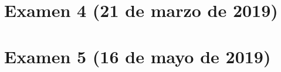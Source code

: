\documentclass[a4paper,12pt,twoside]{book}
\begin{document}
\section{Examen 4 (21 de marzo de 2019)}
\section{Examen 5 (16 de mayo de 2019)}

\appendix %






\nocite{Alonso-12b}
\nocite{Bird-99a}
\nocite{Cunningham-10a}
\nocite{Daume-06}
\nocite{Davie-92a}
\nocite{Doets-04a}
\nocite{Fokker-96}
\nocite{Hudak-00a}
\nocite{Hudak-12a}
\nocite{Hutton-07a}
\nocite{OSullivan-08a}
\nocite{Rabhi-99a}
\nocite{Polya-65a}
\nocite{Ruiz-04}
\nocite{Thompson-11a}



\end{document}
